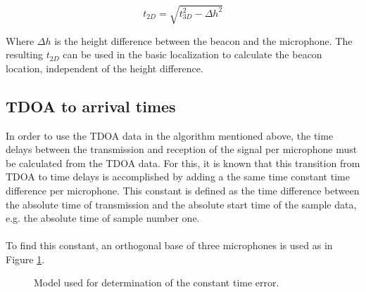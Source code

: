 \documentclass[final]{scrreprt} %
\begin{document}
\begin{equation}
	t_{2D} = \sqrt{t_{3D}^2 - \Delta h^2}
	\label{eq:pythagoras}
\end{equation}

Where $\Delta h$ is the height difference between the beacon and the microphone.
The resulting $t_{2D}$ can be used in the basic localization to calculate the beacon location, independent of the height difference.

\subsection{TDOA to arrival times}
In order to use the TDOA data in the algorithm mentioned above, the time delays between the transmission and reception of the signal per microphone must be calculated from the TDOA data.
For this, it is known that this transition from TDOA to time delays is accomplished by adding a the same time constant time difference per microphone.
This constant is defined as the time difference between the absolute time of transmission and the absolute start time of the sample data, e.g. the absolute time of sample number one.
\\ \\
To find this constant, an orthogonal base of three microphones is used as in Figure \ref{fig:constant}.

\begin{figure} [H]
\centering
	\caption{Model used for determination of the constant time error.}
	\label{fig:constant}
\end{figure}
\end{document}
